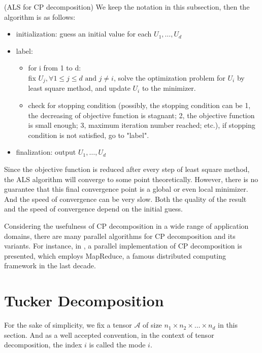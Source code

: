 \documentclass[12pt]{article}
\begin{document}
\begin{myalgo}{(ALS for CP decomposition)}
We keep the notation in this subsection, then the algorithm is as follows:
\begin{itemize}
\item initialization: guess an initial value for each $U_1, \dots, U_d$
\item label: 
	\begin{itemize}
		\item for i from 1 to d: \\
			fix $U_j, \forall 1 \leq j \leq d \text{ and } j \neq i$, solve the optimization problem for $U_i$ by least square method, and update $U_i$ to the minimizer.
		\item check for stopping condition (possibly, the stopping condition can be 1, the decreasing of objective function is stagnant; 2, the objective function is small enough; 3, maximum iteration number reached; etc.), 
			if stopping condition is not satisfied, go to "label".
	\end{itemize}
\item finalization: output $U_1, \dots, U_d$
\end{itemize}
\end{myalgo}

Since the objective function is reduced after every step of least square method, the ALS algorithm will converge to some point theoretically. However, there is no guarantee that this final convergence point is a global or even local minimizer. And the speed of convergence can be very slow. Both the quality of the result and the speed of convergence depend on the initial guess.

Considering the usefulness of CP decomposition in a wide range of application domains, there are many parallel algorithms for CP decomposition and its variants. For instance, in \cite{cpgigatensor}, a parallel implementation of CP decomposition is presented, which employs MapReduce, a famous distributed computing framework in the last decade. 

\section{Tucker Decomposition}
For the sake of simplicity, we fix a tensor $\mathcal{A}$ of size $n_1 \times n_2 \times \dots \times n_d$ in this section. And as a well accepted convention, in the context of tensor decomposition, the index $i$ is called the mode $i$.
\end{document}
